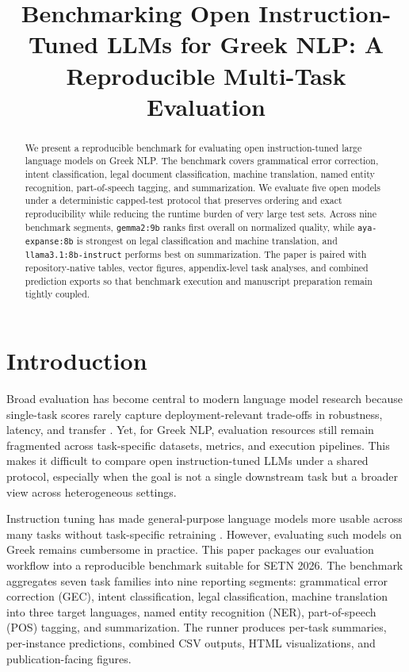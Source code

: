 \documentclass[sigconf,review,anonymous]{acmart}
\title{Benchmarking Open Instruction-Tuned LLMs for Greek NLP: A Reproducible Multi-Task Evaluation}
\begin{document}
\begin{abstract}
We present a reproducible benchmark for evaluating open instruction-tuned large language models on Greek NLP. The benchmark covers grammatical error correction, intent classification, legal document classification, machine translation, named entity recognition, part-of-speech tagging, and summarization. We evaluate five open models under a deterministic capped-test protocol that preserves ordering and exact reproducibility while reducing the runtime burden of very large test sets. Across nine benchmark segments, \texttt{gemma2:9b} ranks first overall on normalized quality, while \texttt{aya-expanse:8b} is strongest on legal classification and machine translation, and \texttt{llama3.1:8b-instruct} performs best on summarization. The paper is paired with repository-native tables, vector figures, appendix-level task analyses, and combined prediction exports so that benchmark execution and manuscript preparation remain tightly coupled.
\end{abstract}

\maketitle

\section{Introduction}
Broad evaluation has become central to modern language model research because single-task scores rarely capture deployment-relevant trade-offs in robustness, latency, and transfer \cite{bommasani2021foundation,liang2023helm,gao2023lmeval}. Yet, for Greek NLP, evaluation resources still remain fragmented across task-specific datasets, metrics, and execution pipelines. This makes it difficult to compare open instruction-tuned LLMs under a shared protocol, especially when the goal is not a single downstream task but a broader view across heterogeneous settings.

Instruction tuning has made general-purpose language models more usable across many tasks without task-specific retraining \cite{wei2022finetuned,chung2024scaling}. However, evaluating such models on Greek remains cumbersome in practice. This paper packages our evaluation workflow into a reproducible benchmark suitable for SETN 2026. The benchmark aggregates seven task families into nine reporting segments: grammatical error correction (GEC), intent classification, legal classification, machine translation into three target languages, named entity recognition (NER), part-of-speech (POS) tagging, and summarization. The runner produces per-task summaries, per-instance predictions, combined CSV outputs, HTML visualizations, and publication-facing figures.
\end{document}
